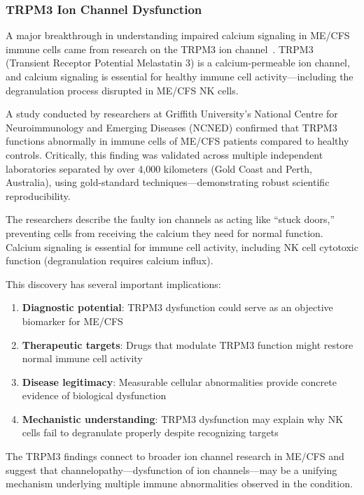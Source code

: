 \subsubsection{TRPM3 Ion Channel Dysfunction}
\label{sec:trpm3-dysfunction}

A major breakthrough in understanding impaired calcium signaling in ME/CFS immune cells came from research on the TRPM3 ion channel~\cite{Sasso2026trpm3}. TRPM3 (Transient Receptor Potential Melastatin 3) is a calcium-permeable ion channel, and calcium signaling is essential for healthy immune cell activity---including the degranulation process disrupted in ME/CFS NK cells.

A study conducted by researchers at Griffith University's National Centre for Neuroimmunology and Emerging Diseases (NCNED) confirmed that TRPM3 functions abnormally in immune cells of ME/CFS patients compared to healthy controls. Critically, this finding was validated across multiple independent laboratories separated by over 4,000 kilometers (Gold Coast and Perth, Australia), using gold-standard techniques---demonstrating robust scientific reproducibility.

The researchers describe the faulty ion channels as acting like ``stuck doors,'' preventing cells from receiving the calcium they need for normal function. Calcium signaling is essential for immune cell activity, including NK cell cytotoxic function (degranulation requires calcium influx).

This discovery has several important implications:
\begin{enumerate}
    \item \textbf{Diagnostic potential}: TRPM3 dysfunction could serve as an objective biomarker for ME/CFS
    \item \textbf{Therapeutic targets}: Drugs that modulate TRPM3 function might restore normal immune cell activity
    \item \textbf{Disease legitimacy}: Measurable cellular abnormalities provide concrete evidence of biological dysfunction
    \item \textbf{Mechanistic understanding}: TRPM3 dysfunction may explain why NK cells fail to degranulate properly despite recognizing targets
\end{enumerate}

The TRPM3 findings connect to broader ion channel research in ME/CFS and suggest that channelopathy---dysfunction of ion channels---may be a unifying mechanism underlying multiple immune abnormalities observed in the condition.

